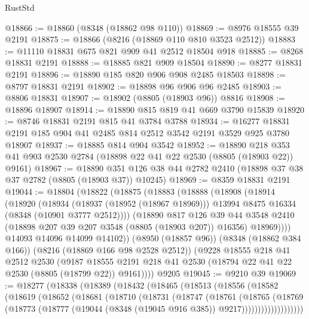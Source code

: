 \begin{lexlean}{RustStd}
\begin{coremodule}
@18866 := @18860 (@8348 (@18862 @98 @110))
@18869 := @8976 @18555 @39 @2191
@18875 := @18866 (@8216 (@18869 @110 @810 @3523 @2512))
@18883 := @11110 @18831 @675 @821 @909 @41 @2512 @18504 @918
@18885 := @8268 @18831 @2191
@18888 := @18885 @821 @909 @18504
@18890 := @8277 @18831 @2191
@18896 := @18890 @185 @820 @906 @908 @2485 @18503
@18898 := @8797 @18831 @2191
@18902 := @18898 @96 @906 @96 @2485
@18903 := @8806 @18831
@18907 := @18902 (@8805 (@18903 @96)) @8816
@18908 := @18896 @18907
@18914 := @18890 @815 @819 @41 @669 @3790 @15839
@18920 := @8746 @18831 @2191 @815 @41 @3784 @3788
@18934 := @16277 @18831 @2191 @185 @904 @41 @2485 @814 @2512 @3542 @2191 @3529 @925 @3780 @18907
@18937 := @18885 @814 @904 @3542
@18952 := @18890
    @218
    @353
    @41
    @903
    @2530
    @2784
    (@18898 @22 @41 @22 @2530 (@8805 (@18903 @22)) @9161)
@18967 := @18890
    @351
    @126
    @38
    @44
    @2782
    @2410
    (@18898 @37 @38 @37 @2782 (@8805 (@18903 @37)) @10245)
@18969 := @8359 @18831 @2191
@19044 := @18804
    (@18822
      (@18875
        (@18883
          (@18888
            (@18908
              (@18914
                (@18920
                  (@18934
                    (@18937 (@18952 (@18967 @18969)))
                    @13994
                    @8475
                    @16334
                    (@8348 (@10901 @3777 @2512))))
                (@18890
                  @817
                  @126
                  @39
                  @44
                  @3548
                  @2410
                  (@18898 @207 @39 @207 @3548 (@8805 (@18903 @207)) @16356)
                  @18969))))
          @14093
          @14096
          @14099
          @14102))
      (@8950 (@18857 @96))
      (@8348 (@18862 @384 @166))
      (@8216 (@18869 @166 @98 @2528 @2512))
      (@9228
        @18555
        @218
        @41
        @2512
        @2530
        (@9187 @18555 @2191 @218 @41 @2530 (@18794 @22 @41 @22 @2530 (@8805 (@18799 @22)) @9161))))
    @9205
@19045 := @9210 @39
@19069 := @18277
    (@18338
      (@18389
        (@18432
          (@18465
            (@18513
              (@18556
                (@18582
                  (@18619
                    (@18652
                      (@18681
                        (@18710
                          (@18731
                            (@18747
                              (@18761
                                (@18765
                                  (@18769
                                    (@18773
                                      (@18777
                                        (@19044 (@8348 (@19045 @916 @385)) @9217)))))))))))))))))))

\end{coremodule}
\end{lexlean}

